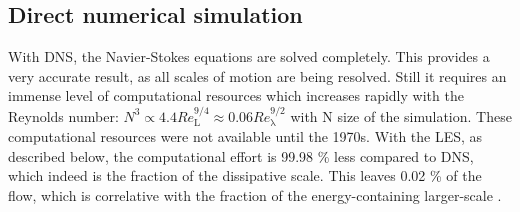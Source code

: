 \documentclass[11pt,a4paper,openany,oneside,parskip=half*]{article}
\begin{document}
\subsection{Direct numerical simulation}
With DNS, the Navier-Stokes equations are solved completely. This provides a very accurate result, as all scales of motion are being resolved. Still it requires an immense level of computational resources which increases rapidly with the Reynolds number: $N^3 \propto 4.4 Re_{\mathrm{L}}^{9/4} \approx 0.06 Re_{\mathrm{\lambda}}^{9/2}$ with N size of the simulation. These computational resources were not available until the 1970s. With the LES, as described below, the computational effort is 99.98 \% less compared to DNS, which indeed is the fraction of the dissipative scale. This leaves 0.02 \% of the flow, which is correlative with the fraction of the energy-containing larger-scale \cite{turbulentFlows}.%
\end{document}
